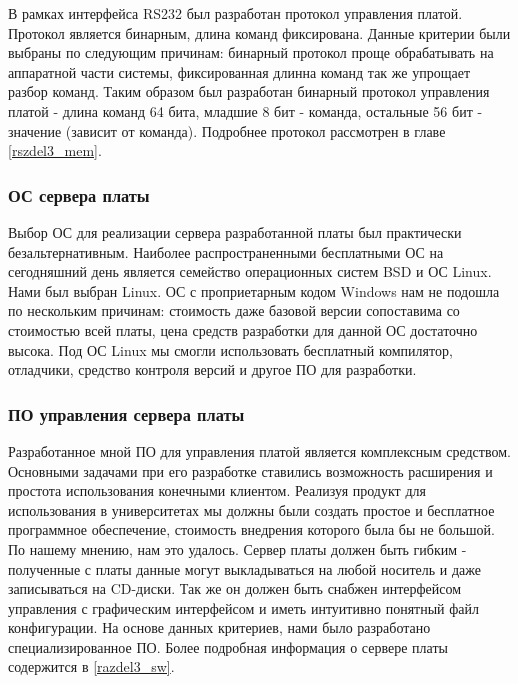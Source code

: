 В рамках интерфейса RS232 был разработан протокол управления платой. Протокол является бинарным, длина команд фиксирована. Данные критерии
были выбраны по следующим причинам: бинарный протокол проще обрабатывать на аппаратной части системы, фиксированная длинна команд так же
упрощает разбор команд. Таким образом был разработан бинарный протокол управления платой - длина команд 64 бита, младшие 8 бит - команда,
остальные 56 бит - значение (зависит от команда). Подробнее протокол рассмотрен в главе \ref{rszdel3_mem}.

\subsubsection{ОС сервера платы}
\label{razdel1_os}
Выбор ОС для реализации сервера разработанной платы был практически безальтернативным. Наиболее распространенными бесплатными ОС
на сегодняшний день является семейство операционных систем BSD и ОС Linux. Нами был выбран Linux. ОС с проприетарным кодом Windows
нам не подошла по нескольким причинам: стоимость даже базовой версии сопоставима со стоимостью всей платы, цена средств разработки
для данной ОС достаточно высока. Под ОС Linux мы смогли использовать бесплатный компилятор, отладчики, средство контроля версий
и другое ПО для разработки.

\subsubsection{ПО управления сервера платы}
\label{razdel1_sw}
Разработанное мной ПО для управления платой является комплексным средством. Основными задачами при его разработке ставились возможность
расширения и простота использования конечными клиентом. Реализуя продукт для использования в университетах мы должны были создать
простое и бесплатное программное обеспечение, стоимость внедрения которого была бы не большой. По нашему мнению, нам это удалось.
Сервер платы должен быть гибким - полученные с платы данные могут выкладываться на любой носитель и даже записываться на CD-диски.
Так же он должен быть снабжен интерфейсом управления с графическим интерфейсом и иметь интуитивно понятный файл конфигурации. На основе
данных критериев, нами было разработано специализированное ПО. Более подробная информация о сервере платы содержится в \ref{razdel3_sw}.

\newpage
